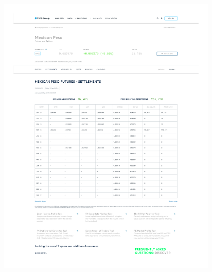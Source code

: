 \documentclass[10pt,a4paper]{article} %
\begin{document}
\begin{figure}[h]
  \centering
  \includegraphics[width=0.99\textwidth]{appendix/MXNUSD12SEP.pdf}
  \label{fig:mxnusd_settlements}
\end{figure}
\end{document}
